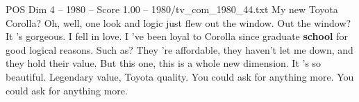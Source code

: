 \begin{textsample}{POS Dim 4 – 1980 – Score 1.00 – 1980/tv\_com\_1980\_44.txt}  \label{ex:f4_pos_070}
My new Toyota Corolla?
Oh, well, one look and logic just flew out the window.
Out the window?
It 's gorgeous.
I fell in love.
I 've been loyal to Corolla since graduate \textbf{school} for good logical reasons.
Such as?
They 're affordable, they haven't let me down, and they hold their value.
But this one, this is a whole new dimension.
It 's so beautiful.
Legendary value, Toyota quality.
You could ask for anything more.
You could ask for anything more.

\end{textsample}

